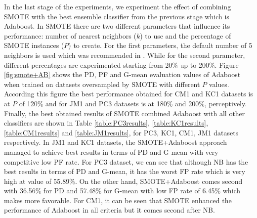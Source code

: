 \documentclass[runningheads,a4paper]{llncs}
\begin{document}
In the last stage of the experiments, we experiment the effect of combining SMOTE with the best ensemble classifier from the previous stage which is Adaboost. In SMOTE there are two different parameters that influence its performance: number of nearest neighbors ($k$) to use and the percentage of SMOTE instances ($P$) to create. For the first parameters, the default number of 5 neighbors is used which was recommended in \cite{chawla2002smote}. While for the second parameter, different percentages are experimented starting from 20\% up to 200\%. Figure \ref{fig:smote+AB} shows the PD, PF and G-mean evaluation values of Adaboost when trained on datasets oversampled by SMOTE with different $P$ values. According this figure the best performance obtained for CM1 and KC1 datasets is at $P$ of 120\% and for JM1 and PC3 datasets is at 180\% and 200\%, perceptively. Finally, the best obtained results of SMOTE combined Adaboost with all other classifiers are shown in Table \ref{table:PC3results}, \ref{table:KC1results}, \ref{table:CM1results} and \ref{table:JM1results}, for PC3, KC1, CM1, JM1 datasets respectively. In JM1 and KC1 datasets, the SMOTE+Adaboost approach managed to achieve best results in terms of PD and G-mean with very competitive low PF rate. For PC3 dataset, we can see that although NB has the best results in terms of PD and G-mean, it has the worst FP rate which is very high at value of 55.89\%. On the other hand, SMOTE+Adaboost comes second with 36.56\%  for PD and 57.48\% for G-mean with low FP rate of 6.45\% which makes more favorable. For CM1, it can be seen that SMOTE enhanced the performance of Adaboost in all criteria but it comes second after NB. 





 
\end{document}
